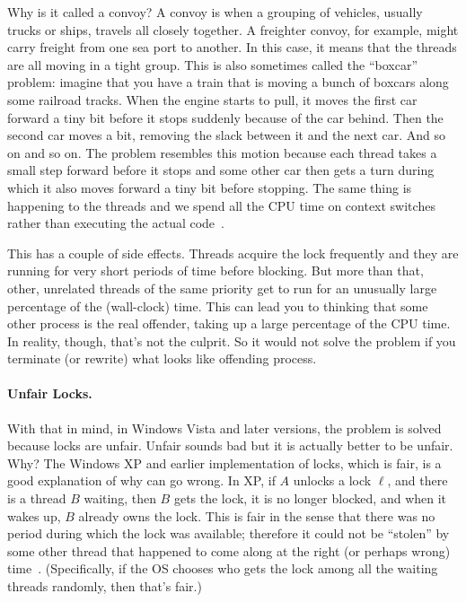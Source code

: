 Why is it called a convoy? A convoy is when a grouping of vehicles, usually trucks or ships, travels all closely together. A freighter convoy, for example, might carry freight from one sea port to another. In this case, it means that the threads are all moving in a tight group. This is also sometimes called the ``boxcar'' problem: imagine that you have a train that is moving a bunch of boxcars along some railroad tracks. When the engine starts to pull, it moves the first car forward a tiny bit before it stops suddenly because of the car behind. Then the second car moves a bit, removing the slack between it and the next car. And so on and so on. The problem resembles this motion because each thread takes a small step forward before it stops and some other car then gets a turn during which it also moves forward a tiny bit before stopping. The same thing is happening to the threads and we spend all the CPU time on context switches rather than executing the actual code~\cite{boxcar}.

This has a couple of side effects. Threads acquire the lock frequently and they are running for very short periods of time before blocking. But more than that, other, unrelated threads of the same priority get to run for an unusually large percentage of the (wall-clock) time. This can lead you to thinking that some other process is the real offender, taking up a large percentage of the CPU time. In reality, though, that's not the culprit. So it would not solve the problem if you terminate (or rewrite) what looks like offending process. 

\paragraph{Unfair Locks.} With that in mind, in Windows Vista and later versions, the problem is solved because locks are unfair. Unfair sounds bad but it is actually better to be unfair. Why? The Windows XP and earlier implementation of locks, which is fair, is a good explanation of why can go wrong. In XP, if $A$ unlocks a lock $\ell$, and there is a thread $B$ waiting, then $B$ gets the lock, it is no longer blocked, and when it wakes up, $B$ already owns the lock. This is fair in the sense that there was no period during which the lock was available; therefore it could not be ``stolen'' by some other thread that happened to come along at the right (or perhaps wrong) time~\cite{anticonvoy}. (Specifically, if the OS chooses who gets the lock among all the waiting threads randomly, then that's fair.)

